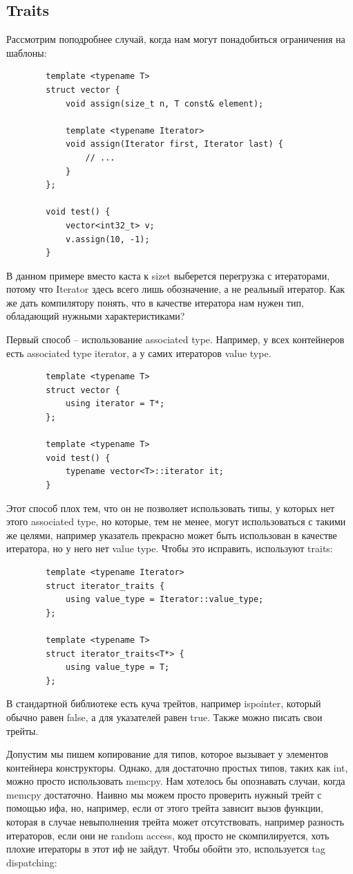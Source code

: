\documentclass[12pt, a4paper]{article}
\begin{document}
	\subsection{Traits}
	Рассмотрим поподробнее случай, когда нам могут понадобиться ограничения на шаблоны:
	\begin{verbatim}
		template <typename T>
		struct vector {
			void assign(size_t n, T const& element);
			
			template <typename Iterator>
			void assign(Iterator first, Iterator last) {
				// ...
			}
		};
		
		void test() {
			vector<int32_t> v;
			v.assign(10, -1);
		}
	\end{verbatim}
	В данном примере вместо каста к size\textunderscore t выберется перегрузка с итераторами, потому что Iterator здесь всего лишь обозначение, а не реальный итератор. Как же дать компилятору понять, что в качестве итератора нам нужен тип, обладающий нужными характеристиками?
	\par Первый способ -- использование associated type. Например, у всех контейнеров есть associated type iterator, а у самих итераторов value type.
	\begin{verbatim}
		template <typename T>
		struct vector {
			using iterator = T*;  
		};
		
		template <typename T>
		void test() {
			typename vector<T>::iterator it;
		}
	\end{verbatim}
	Этот способ плох тем, что он не позволяет использовать типы, у которых нет этого associated type, но которые, тем не менее, могут использоваться с такими же целями, например указатель прекрасно может быть использован в качестве итератора, но у него нет value type. Чтобы это исправить, используют traits:
	\begin{verbatim}
		template <typename Iterator>
		struct iterator_traits {
			using value_type = Iterator::value_type;
		};
		
		template <typename T>
		struct iterator_traits<T*> {
			using value_type = T;  
		};
	\end{verbatim}
	В стандартной библиотеке есть куча трейтов, например is\textunderscore pointer, который обычно равен false, а для указателей равен true. Также можно писать свои трейты.
	\\\par Допустим мы пишем копирование для типов, которое вызывает у элементов контейнера конструкторы. Однако, для достаточно простых типов, таких как int, можно просто использовать memcpy. Нам хотелось бы опознавать случаи, когда memcpy достаточно. Наивно мы можем просто проверить нужный трейт с помощью ифа, но, например, если от этого трейта зависит вызов функции, которая в случае невыполнения трейта может отсутствовать, например разность итераторов, если они не random access, код просто не скомпилируется, хоть плохие итераторы в этот иф не зайдут. Чтобы обойти это, используется tag dispatching:
\end{document}
